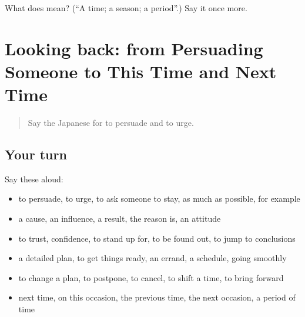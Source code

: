 \begin{tcolorbox}[breakable,colback=teal!4,colframe=teal!35!black,title={Before you move on}]
What does  mean? (\textquotedblleft{}A time; a season; a period\textquotedblright{}.) Say it once more.
\end{tcolorbox}
\section[(dialogue)]{Looking back: from Persuading Someone to This Time and Next Time}

\label{lesson:JA-R346-review-341-346}



\begin{quote}
Say the Japanese for to persuade and to urge.
\end{quote}

\subsection*{Your turn}
Say these aloud:

\begin{itemize}
\raggedright
  \item to persuade, to urge, to ask someone to stay, as much as possible, for example
  \item a cause, an influence, a result, the reason is, an attitude
  \item to trust, confidence, to stand up for, to be found out, to jump to conclusions
  \item a detailed plan, to get things ready, an errand, a schedule, going smoothly
  \item to change a plan, to postpone, to cancel, to shift a time, to bring forward
  \item next time, on this occasion, the previous time, the next occasion, a period of time
\end{itemize}

